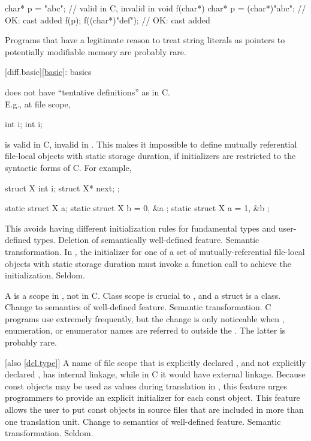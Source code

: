 \begin{codeblock}
char* p = "abc";                // valid in C, invalid in \Cpp{}
void f(char*) {
  char* p = (char*)"abc";       // OK: cast added
  f(p);
  f((char*)"def");              // OK: cast added
}
\end{codeblock}

\howwide
Programs that have a legitimate reason to treat string literals
as pointers to potentially modifiable memory are probably rare.

[diff.basic]{\ref{basic}: basics}

\change
\Cpp{} does not have ``tentative definitions'' as in C.\\
E.g., at file scope,
\begin{codeblock}
int i;
int i;
\end{codeblock}
is valid in C, invalid in \Cpp{}.
This makes it impossible to define
mutually referential file-local objects with static storage duration,
if initializers are restricted to the syntactic forms of C\@.
For example,
\begin{codeblock}
struct X { int i; struct X* next; };

static struct X a;
static struct X b = { 0, &a };
static struct X a = { 1, &b };
\end{codeblock}

\rationale
This avoids having different initialization rules for
fundamental types and user-defined types.
\effect
Deletion of semantically well-defined feature.
\difficulty
Semantic transformation.
In \Cpp{}, the initializer for one of a set of
mutually-referential file-local objects with static storage
duration must invoke a function
call to achieve the initialization.
\howwide
Seldom.

\change
A  is a scope in \Cpp{}, not in C.
\rationale
Class scope is crucial to \Cpp{}, and a struct is a class.
\effect
Change to semantics of well-defined feature.
\difficulty
Semantic transformation.
\howwide
C programs use  extremely frequently, but the
change is only noticeable when , enumeration, or enumerator
names are referred to outside the .
The latter is probably rare.

 [also \ref{dcl.type}]
\change
A name of file scope that is explicitly declared , and not explicitly
declared , has internal linkage, while in C it would have external linkage.
\rationale
Because const objects may be used as values during translation in
\Cpp{}, this feature urges programmers to provide an explicit initializer
for each const object.
This feature allows the user to put const objects in source files that are included
in more than one translation unit.
\effect
Change to semantics of well-defined feature.
\difficulty
Semantic transformation.
\howwide
Seldom.


